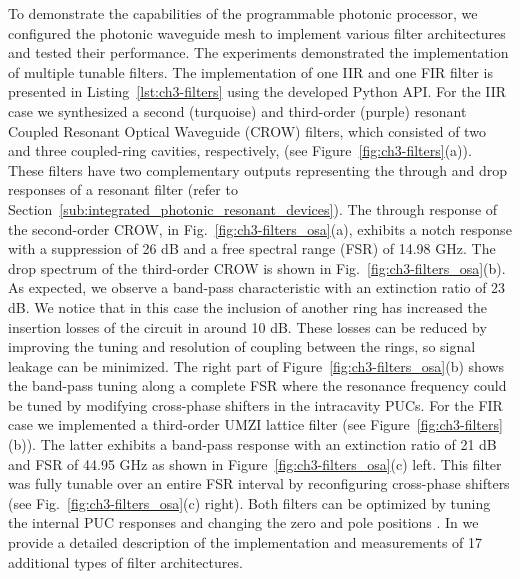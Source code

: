 To demonstrate the capabilities of the programmable photonic processor, we configured the photonic waveguide mesh to implement various filter architectures and tested their performance.
The experiments demonstrated the implementation of multiple tunable filters.
The implementation of one IIR and one FIR filter is presented in Listing~\ref{lst:ch3-filters} using the developed Python API.
For the IIR case we synthesized a second (turquoise) and third-order (purple) resonant Coupled Resonant Optical Waveguide (CROW) filters, which consisted of two and three coupled-ring cavities, respectively, (see Figure~\ref{fig:ch3-filters}(a)).
These filters have two complementary outputs representing the through and drop responses of a resonant filter (refer to Section~\ref{sub:integrated_photonic_resonant_devices}).
The through response of the second-order CROW, in Fig.~\ref{fig:ch3-filters_osa}(a), exhibits a notch response with a suppression of 26 dB and a free spectral range (FSR) of 14.98 GHz.
The drop spectrum of the third-order CROW is shown in Fig.~\ref{fig:ch3-filters_osa}(b).
As expected, we observe a band-pass characteristic with an extinction ratio of 23 dB.
We notice that in this case the inclusion of another ring has increased the insertion losses of the circuit in around 10 dB.
These losses can be reduced by improving the tuning and resolution of coupling between the rings, so signal leakage can be minimized.
The right part of Figure~\ref{fig:ch3-filters_osa}(b) shows the band-pass tuning along a complete FSR where the resonance frequency could be tuned by modifying cross-phase shifters in the intracavity PUCs.
For the FIR case we implemented a third-order UMZI lattice filter (see Figure~\ref{fig:ch3-filters}(b)).
The latter exhibits a band-pass response with an extinction ratio of 21 dB and FSR of 44.95 GHz as shown in Figure~\ref{fig:ch3-filters_osa}(c) left.
This filter was fully tunable over an entire FSR interval by reconfiguring cross-phase shifters (see Fig.~\ref{fig:ch3-filters_osa}(c) right).
Both filters can be optimized by tuning the internal PUC responses and changing the zero and pole positions \cite{madsen_digital_1999}.
In \cite{perez-lopez_supplementary_2024} we provide a detailed description of the implementation and measurements of 17 additional types of filter architectures.

